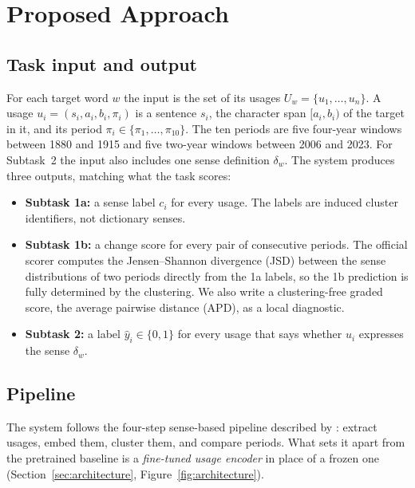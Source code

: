 \section{Proposed Approach}
\label{sec:approach}

\subsection{Task input and output}
\label{sec:approach-io}

For each target word $w$ the input is the set of its usages
$U_w=\{u_1,\dots,u_n\}$. A usage $u_i=(s_i,a_i,b_i,\pi_i)$ is a sentence $s_i$,
the character span $[a_i,b_i)$ of the target in it, and its period
$\pi_i\in\{\pi_1,\dots,\pi_{10}\}$. The ten periods are five four-year windows
between 1880 and 1915 and five two-year windows between 2006 and 2023. For
Subtask~2 the input also includes one sense definition $\delta_w$. The system
produces three outputs, matching what the task scores:
\begin{itemize}
  \item \textbf{Subtask 1a:} a sense label $c_i$ for every usage. The labels are
        induced cluster identifiers, not dictionary senses.
  \item \textbf{Subtask 1b:} a change score for every pair of consecutive periods.
        The official scorer computes the Jensen--Shannon divergence (JSD)
        between the sense distributions of two periods directly from the 1a
        labels, so the 1b prediction is fully determined by the clustering. We
        also write a clustering-free graded score, the average pairwise distance
        (APD), as a local diagnostic.
  \item \textbf{Subtask 2:} a label $\hat y_i\in\{0,1\}$ for every usage that says
        whether $u_i$ expresses the sense $\delta_w$.
\end{itemize}

\subsection{Pipeline}
\label{sec:approach-pipeline}

The system follows the four-step sense-based pipeline described by
\citet{periti2024towards}: extract usages, embed them, cluster them, and compare
periods. What sets it apart from the pretrained baseline is a
\emph{fine-tuned usage encoder} in place of a frozen one
(Section~\ref{sec:architecture}, Figure~\ref{fig:architecture}).

